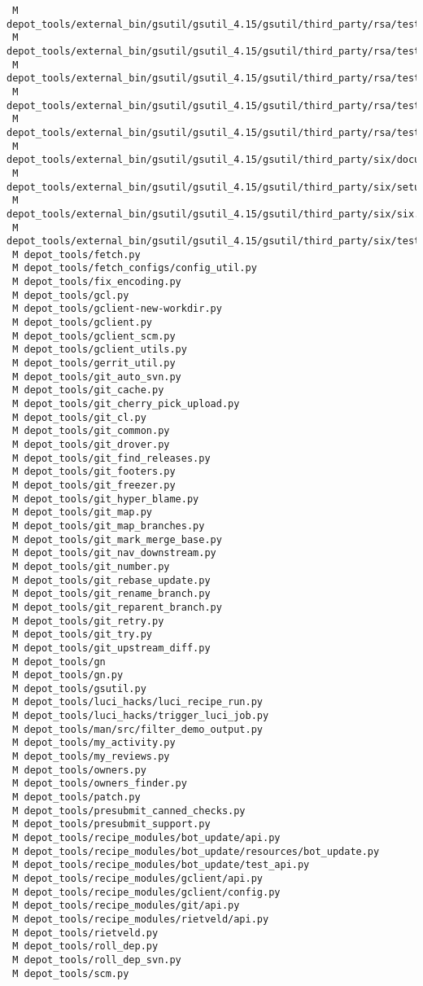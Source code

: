 \documentclass{article}
\begin{document}
\begin{verbatim}
 M depot_tools/external_bin/gsutil/gsutil_4.15/gsutil/third_party/rsa/tests/test_bigfile.py
 M depot_tools/external_bin/gsutil/gsutil_4.15/gsutil/third_party/rsa/tests/test_integers.py
 M depot_tools/external_bin/gsutil/gsutil_4.15/gsutil/third_party/rsa/tests/test_pkcs1.py
 M depot_tools/external_bin/gsutil/gsutil_4.15/gsutil/third_party/rsa/tests/test_strings.py
 M depot_tools/external_bin/gsutil/gsutil_4.15/gsutil/third_party/rsa/tests/test_varblock.py
 M depot_tools/external_bin/gsutil/gsutil_4.15/gsutil/third_party/six/documentation/conf.py
 M depot_tools/external_bin/gsutil/gsutil_4.15/gsutil/third_party/six/setup.py
 M depot_tools/external_bin/gsutil/gsutil_4.15/gsutil/third_party/six/six.py
 M depot_tools/external_bin/gsutil/gsutil_4.15/gsutil/third_party/six/test_six.py
 M depot_tools/fetch.py
 M depot_tools/fetch_configs/config_util.py
 M depot_tools/fix_encoding.py
 M depot_tools/gcl.py
 M depot_tools/gclient-new-workdir.py
 M depot_tools/gclient.py
 M depot_tools/gclient_scm.py
 M depot_tools/gclient_utils.py
 M depot_tools/gerrit_util.py
 M depot_tools/git_auto_svn.py
 M depot_tools/git_cache.py
 M depot_tools/git_cherry_pick_upload.py
 M depot_tools/git_cl.py
 M depot_tools/git_common.py
 M depot_tools/git_drover.py
 M depot_tools/git_find_releases.py
 M depot_tools/git_footers.py
 M depot_tools/git_freezer.py
 M depot_tools/git_hyper_blame.py
 M depot_tools/git_map.py
 M depot_tools/git_map_branches.py
 M depot_tools/git_mark_merge_base.py
 M depot_tools/git_nav_downstream.py
 M depot_tools/git_number.py
 M depot_tools/git_rebase_update.py
 M depot_tools/git_rename_branch.py
 M depot_tools/git_reparent_branch.py
 M depot_tools/git_retry.py
 M depot_tools/git_try.py
 M depot_tools/git_upstream_diff.py
 M depot_tools/gn
 M depot_tools/gn.py
 M depot_tools/gsutil.py
 M depot_tools/luci_hacks/luci_recipe_run.py
 M depot_tools/luci_hacks/trigger_luci_job.py
 M depot_tools/man/src/filter_demo_output.py
 M depot_tools/my_activity.py
 M depot_tools/my_reviews.py
 M depot_tools/owners.py
 M depot_tools/owners_finder.py
 M depot_tools/patch.py
 M depot_tools/presubmit_canned_checks.py
 M depot_tools/presubmit_support.py
 M depot_tools/recipe_modules/bot_update/api.py
 M depot_tools/recipe_modules/bot_update/resources/bot_update.py
 M depot_tools/recipe_modules/bot_update/test_api.py
 M depot_tools/recipe_modules/gclient/api.py
 M depot_tools/recipe_modules/gclient/config.py
 M depot_tools/recipe_modules/git/api.py
 M depot_tools/recipe_modules/rietveld/api.py
 M depot_tools/rietveld.py
 M depot_tools/roll_dep.py
 M depot_tools/roll_dep_svn.py
 M depot_tools/scm.py

\end{verbatim}
\end{document}
